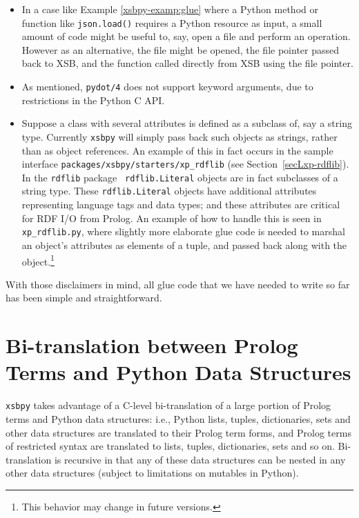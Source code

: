 \begin{itemize}
\item In a case like Example \ref{xsbpy-examp:glue} where a Python
  method or function like {\tt json.load()} requires a Python resource
  as input, a small amount of code might be useful to, say, open a
  file and perform an operation.  However as an alternative, the file
  might be opened, the file pointer passed back to XSB, and the
  function called directly from XSB using the file pointer.

  \item As mentioned, {\tt pydot/4} does not support keyword
    arguments, due to restrictions in the Python C API.

  \item Suppose a class with several attributes is defined as a
    subclass of, say a string type.  Currently {\tt xsbpy} will simply
    pass back such objects as strings, rather than as object
    references.  An example of this in fact occurs in the sample
    interface {\tt packages/xsbpy/starters/xp\_rdflib} (see
    Section~\ref{secLxp-rdflib}).  In the {\tt rdflib} package {\tt
      rdflib.Literal} objects are in fact subclasses of a string type.
    These {\tt rdflib.Literal} objects have additional attributes
    representing language tags and data types; and these attributes
    are critical for RDF I/O from Prolog.  An example of how to handle
    this is seen in {\tt xp\_rdflib.py}, where slightly more elaborate
    glue code is needed to marshal an object's attributes as elements
    of a tuple, and passed back along with the object.\footnote{This
      behavior may change in future versions.}
\end{itemize}

With those disclaimers in mind, all glue code that we have needed to
write so far has been simple and straightforward.

\section{Bi-translation between Prolog Terms and Python Data Structures} \label{sec:bi-translation}

{\tt xsbpy} takes advantage of a C-level bi-translation of a large
portion of Prolog terms and Python data structures: i.e., Python
lists, tuples, dictionaries, sets and other data structures are
translated to their Prolog term forms, and Prolog terms of restricted
syntax are translated to lists, tuples, dictionaries, sets and so on.
Bi-translation is recursive in that any of these data structures can
be nested in any other data structures (subject to limitations on
mutables in Python).
     
